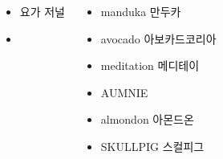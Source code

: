 \documentclass[25pt, a1paper ]{tikzposter}
\begin{document}
\begin{columns}
			{				
			\setlength{\leftmargini}{3em}			
			\setlength{\labelsep}{1em} %
			\begin{LARGE}
			\begin{itemize}
			\item 요가 저널
			\item 
			\end{itemize}
			\end{LARGE}
		}


			{				
			\setlength{\leftmargini}{3em}			
			\setlength{\labelsep}{1em} %
			\begin{LARGE}
			\begin{itemize}
			\item manduka 만두카
			\item avocado 아보카드코리아
			\item meditation 메디테이
			\item AUMNIE
			\item almondon 아몬드온
			\item SKULLPIG 스컬피그

			\end{itemize}
			\end{LARGE}
		}


	\end{columns}
\end{document}

